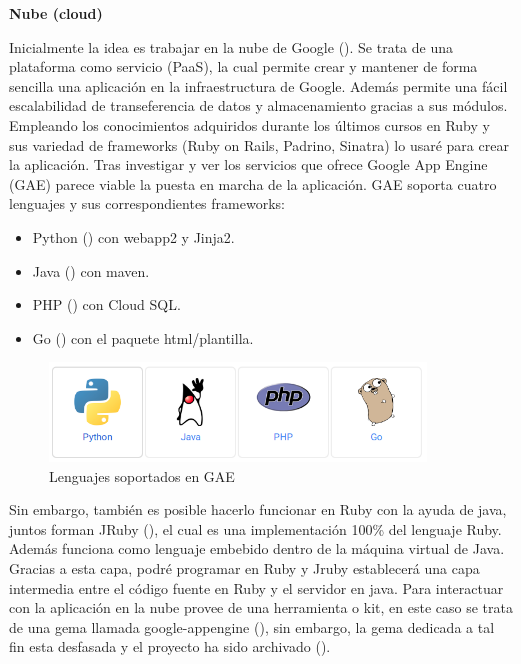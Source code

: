 \vspace*{0.3in}
\begin{LARGE}
	\textbf{{\huge Nube (cloud)}}
\end{LARGE}

\vspace*{0.1in}
Inicialmente la idea es trabajar en la nube de Google (\cite{URL:GAEdoc}). Se trata de una plataforma como servicio (PaaS), la cual permite crear y mantener de forma sencilla una aplicación en la infraestructura de Google. Además permite una fácil escalabilidad de transeferencia de datos y almacenamiento gracias a sus módulos.\\

Empleando los conocimientos adquiridos durante los últimos cursos en Ruby y sus variedad de frameworks (Ruby on Rails, Padrino, Sinatra) lo usaré para crear la aplicación. Tras investigar y ver los servicios que ofrece Google App Engine (GAE) parece viable la puesta en marcha de la aplicación. GAE soporta cuatro lenguajes y sus correspondientes frameworks:
\begin{itemize}
	\item Python (\cite{URL:GAE_Python}) con webapp2 y Jinja2.
	\item Java (\cite{URL:GAE_Java}) con maven.
	\item PHP (\cite{URL:GAE_PHP}) con Cloud SQL.
	\item Go (\cite{URL:GAE_Go}) con el paquete html/plantilla. 
\end{itemize}

\begin{figure}[H]
	\centering
		\includegraphics[width=10cm]{./images/lenguajes-GAE.png}
		\caption{Lenguajes soportados en GAE} \label{fig:lenguajes-GAE}
\end{figure}

Sin embargo, también es posible hacerlo funcionar en Ruby con la ayuda de java, juntos forman JRuby (\cite{URL:JRuby}), el cual es una implementación 100\% del lenguaje Ruby. Además funciona como lenguaje embebido dentro de la máquina virtual de Java. Gracias a esta capa, podré programar en Ruby y Jruby establecerá una capa intermedia entre el código fuente en Ruby y el servidor en java. Para interactuar con la aplicación en la nube provee de una herramienta o kit, en este caso se trata de una gema llamada google-appengine (\cite{URL:GAE_gem}), sin embargo, la gema
dedicada a tal fin esta desfasada y el proyecto ha sido archivado (\cite{URL:GAE_JRuby}).\\

